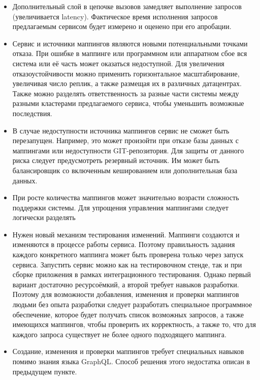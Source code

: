 \begin{itemize}
    \item Дополнительный слой в цепочке вызовов замедляет выполнение запросов (увеличивается latency).
    Фактическое время исполнения запросов предлагаемым сервисом будет измерено и оценено при его апробации.

    \item Сервис и источники маппингов являются новыми потенциальными точками отказа.
    При ошибке в маппинге или программном или аппаратном сбое вся система или её часть может оказаться недоступной.
    Для увеличения отказоустойчивости можно применить горизонтальное масштабирование, увеличивая число реплик, а также размещая их в различных датацентрах.
    Также можно разделять ответственность за разные части системы между разными кластерами предлагаемого сервиса, чтобы уменьшить возможные последствия.

    \item В случае недоступности источника маппингов сервис не сможет быть перезапущен.
    Например, это может произойти при отказе базы данных с маппингами или недоступности GIT-репозитория.
    Для защиты от данного риска следует предусмотреть резервный источник.
    Им может быть балансировщик со включенным кешированием или дополнительная база данных.

    \item При росте количества маппингов может значительно возрасти сложность поддержки системы.
    Для упрощения управления маппингами следует логически разделять

    \item Нужен новый механизм тестирования изменений.
    Маппинги создаются и изменяются в процессе работы сервиса.
    Поэтому правильность задания каждого конкретного маппинга может быть проверена только через запуск сервиса.
    Запустить сервис можно как на тестировочном стенде, так и при сборке приложения в рамках интеграционного тестирования.
    Однако первый вариант достаточно ресурсоёмкий, а второй требует навыков разработки.
    Поэтому для возможности добавления, изменения и проверки маппингов людьми без опыта разработки следует разработать специальное программное обеспечение, которое будет получать список возможных запросов, а также имеющихся маппингов, чтобы проверить их корректность, а также то, что для каждого запроса существует не более одного подходящего маппинга.

    \item Создание, изменения и проверки маппингов требует специальных навыков помимо знания языка GraphQL\@.
    Способ решения этого недостатка описан в предыдущем пункте.

\end{itemize}

